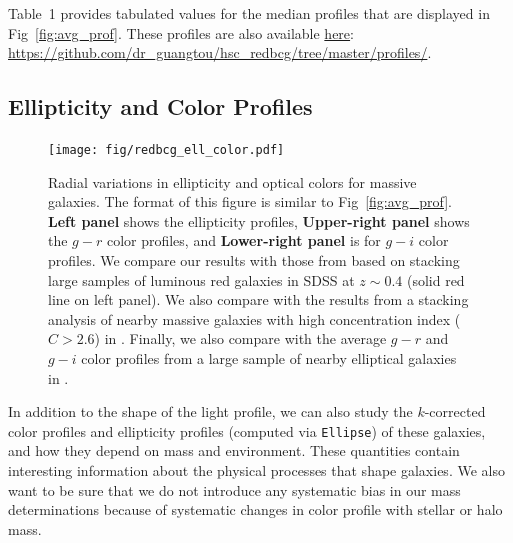 \documentclass[a4paper,fleqn,usenatbib]{mnras}
\begin{document}
    Table~1 provides tabulated values for the median profiles that are 
    displayed in Fig~\ref{fig:avg_prof}. 
    These profiles are also available  
    \href{https://github.com/dr-guangtou/hsc_redbcg/tree/master/profiles}{here}:
    {\url{https://github.com/dr_guangtou/hsc_redbcg/tree/master/profiles/}}.
    

\subsection{Ellipticity and Color Profiles}
    \label{ssec:ell_color}
    
  \begin{figure}
      \centering 
      \texttt{[image: fig/redbcg\_ell\_color.pdf]}
      \caption{
          Radial variations in ellipticity and optical colors for massive galaxies. 
          The format of this figure is similar to Fig~\ref{fig:avg_prof}. 
          \textbf{Left panel} shows the ellipticity profiles, 
          \textbf{Upper-right panel} shows the $g-r$ color profiles, and 
          \textbf{Lower-right panel} is for $g-i$ color profiles. 
          We compare our results with those from \citet{Tal2011} based on stacking 
          large samples of luminous red galaxies in SDSS at $z{\sim} 0.4$ 
          (solid red line on left panel). 
          We also compare with the results from a stacking analysis of nearby massive 
          galaxies with high concentration index ($C>2.6$) in 
          \citet[][blue dash lines on the left and upper-right panels]{DSouza2014}. 
          Finally, we also compare with the average $g-r$ and $g-i$ color profiles 
          from a large sample of nearby elliptical galaxies in \citet[][blue, solid 
          lines on both right panels]{LaBarbera2010}.
          }
      \label{fig:ell_color}
  \end{figure}
    
	In addition to the shape of the light profile, we can also 
    study the $k$-corrected color profiles and ellipticity profiles 
    (computed via \texttt{Ellipse}) of these galaxies, and how 
    they depend on mass and environment.
    These quantities contain interesting information about the physical processes that 
    shape galaxies. We also want to be sure that we do not introduce any systematic bias in 
    our mass determinations because of systematic changes in color profile with stellar or 
    halo mass.
       
\end{document}
